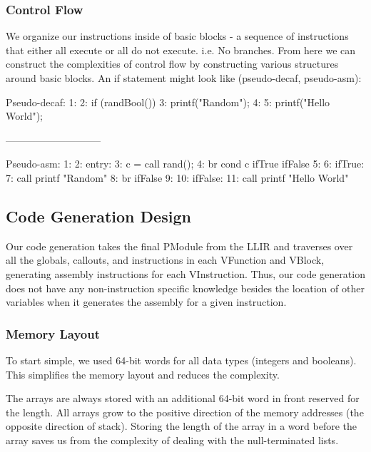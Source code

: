 \documentclass[11pt]{article}
\begin{document}
\subsubsection{Control Flow}

\par We organize our instructions inside of basic blocks - a sequence of instructions that either all execute or all do not execute. i.e. No branches. From here we can construct the complexities of control flow by constructing various structures around basic blocks. An if statement might look like (pseudo-decaf, pseudo-asm):

\begin{verbbox}
Pseudo-decaf:
1:
2:   if (randBool()) {
3:       printf("Random");
4:   }
5:   printf("Hello World\n");

-----------------------------

Pseudo-asm:
1:
2:   entry:
3:       c = call rand();
4:           br cond c ifTrue ifFalse
5:
6:   ifTrue:
7:       call printf "Random"
8:       br ifFalse
9:
10:   ifFalse:
11:       call printf "Hello World\n"
\end{verbbox}
\begin{center}\theverbbox\end{center}

\subsection{Code Generation Design}

\par Our code generation takes the final PModule from the LLIR and traverses over all the globals, callouts, and instructions in each VFunction and VBlock, generating assembly instructions for each VInstruction. Thus, our code generation does not have any non-instruction specific knowledge besides the location of other variables when it generates the assembly for a given instruction.

\subsubsection{Memory Layout}

\par To start simple, we used 64-bit words for all data types (integers and booleans). This simplifies the memory layout and reduces the complexity.

\par The arrays are always stored with an additional 64-bit word in front reserved for the length. All arrays grow to the positive direction of the memory addresses (the opposite direction of stack). Storing the length of the array in a word before the array saves us from the complexity of dealing with the null-terminated lists.
\end{document}

